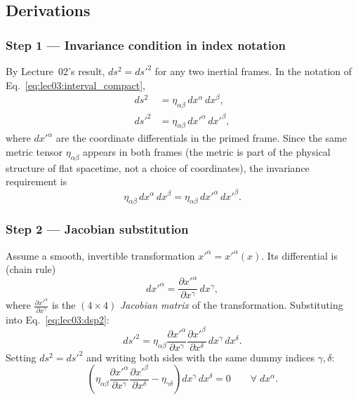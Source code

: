 \subsection*{Derivations}

\subsubsection*{Step 1 — Invariance condition in index notation}

By Lecture~02's result, $ds^2 = ds'^2$ for any two inertial frames.
In the notation of Eq.~\eqref{eq:lec03:interval_compact},
\begin{align}
  ds^2 &= \eta_{\alpha\beta}\,dx^\alpha\,dx^\beta, \label{eq:lec03:ds2}\\
  ds'^2 &= \eta_{\alpha\beta}\,dx'^\alpha\,dx'^\beta, \label{eq:lec03:dsp2}
\end{align}
where $dx'^\alpha$ are the coordinate differentials in the primed frame.
Since the same metric tensor $\eta_{\alpha\beta}$ appears in both frames
(the metric is part of the physical structure of flat spacetime, not a
choice of coordinates), the invariance requirement is
\begin{equation}
  \eta_{\alpha\beta}\,dx^\alpha\,dx^\beta
  = \eta_{\alpha\beta}\,dx'^\alpha\,dx'^\beta.
  \label{eq:lec03:inv_cond}
\end{equation}

\subsubsection*{Step 2 — Jacobian substitution}

Assume a smooth, invertible transformation $x'^\alpha = x'^\alpha(x)$.
Its differential is (chain rule)
\begin{equation}
  dx'^\alpha = \frac{\partial x'^\alpha}{\partial x^\gamma}\,dx^\gamma,
  \label{eq:lec03:differential}
\end{equation}
where $\frac{\partial x'^\alpha}{\partial x^\gamma}$ is the
$(4\times 4)$ \emph{Jacobian matrix} of the transformation.
Substituting into Eq.~\eqref{eq:lec03:dsp2}:
\begin{equation}
  ds'^2 = \eta_{\alpha\beta}
          \frac{\partial x'^\alpha}{\partial x^\gamma}
          \frac{\partial x'^\beta}{\partial x^\delta}
          \,dx^\gamma\,dx^\delta.
  \label{eq:lec03:dsp2_sub}
\end{equation}
Setting $ds^2 = ds'^2$ and writing both sides with the same dummy
indices $\gamma,\delta$:
\begin{equation}
  \left(
    \eta_{\alpha\beta}
    \frac{\partial x'^\alpha}{\partial x^\gamma}
    \frac{\partial x'^\beta}{\partial x^\delta}
    - \eta_{\gamma\delta}
  \right)
  dx^\gamma\,dx^\delta = 0
  \qquad \forall\; dx^\alpha.
  \label{eq:lec03:M_cond_raw}
\end{equation}

